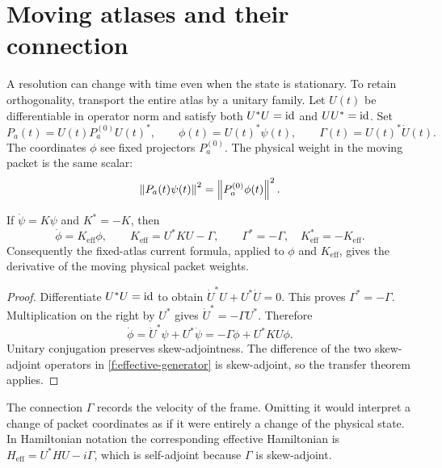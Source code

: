 \section{Moving atlases and their connection}\label{f:moving}

A resolution can change with time even when the state is stationary. To retain orthogonality, transport the entire atlas by a unitary family. Let $U(t)$ be differentiable in operator norm and satisfy both $U^*U=\mathrm{id}$ and $UU^*=\mathrm{id}$. Set
\begin{equation}\label{f:moving-defs}
 P_a(t)=U(t)P_a^{(0)}U(t)^*,\qquad
 \phi(t)=U(t)^*\psi(t),\qquad \Gamma(t)=U(t)^*\dot U(t).
\end{equation}
The coordinates $\phi$ see fixed projectors $P_a^{(0)}$. The physical weight in the moving packet is the same scalar:
\[
 \left\lVert P_a(t)\psi(t)\right\rVert^2
 =\left\lVert P_a^{(0)}\phi(t)\right\rVert^2.
\]

\begin{proposition}\label{f:moving-theorem}
If $\dot\psi=K\psi$ and $K^*=-K$, then
\begin{equation}\label{f:effective-generator}
 \dot\phi=K_{\mathrm{eff}}\phi,\qquad
 K_{\mathrm{eff}}=U^*KU-\Gamma,\qquad
 \Gamma^*=-\Gamma,\quad K_{\mathrm{eff}}^*=-K_{\mathrm{eff}}.
\end{equation}
Consequently the fixed-atlas current formula, applied to $\phi$ and $K_{\mathrm{eff}}$, gives the derivative of the moving physical packet weights.
\end{proposition}

\begin{proof}
Differentiate $U^*U=\mathrm{id}$ to obtain
$\dot U^*U+U^*\dot U=0$. This proves $\Gamma^*=-\Gamma$.
Multiplication on the right by $U^*$ gives $\dot U^*=-\Gamma U^*$. Therefore
\[
 \dot\phi=\dot U^*\psi+U^*\dot\psi
 =-\Gamma\phi+U^*KU\phi.
\]
Unitary conjugation preserves skew-adjointness. The difference of the two skew-adjoint operators in \eqref{f:effective-generator} is skew-adjoint, so the transfer theorem applies.
\end{proof}

The connection $\Gamma$ records the velocity of the frame. Omitting it would interpret a change of packet coordinates as if it were entirely a change of the physical state. In Hamiltonian notation the corresponding effective Hamiltonian is
$H_{\mathrm{eff}}=U^*HU-i\Gamma$, which is self-adjoint because $\Gamma$ is skew-adjoint.

